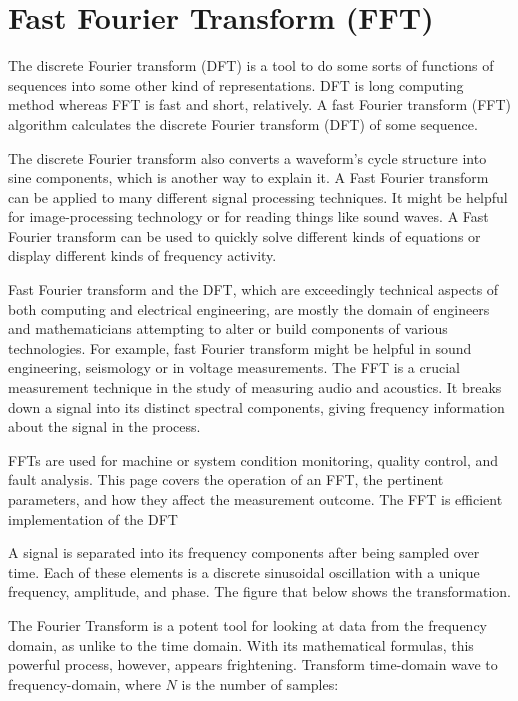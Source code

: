 \documentclass[a4paper, 12pt]{scrartcl}
\begin{document}
\section{Fast Fourier Transform (FFT)}

The discrete Fourier transform (DFT) is a tool to do some sorts of functions of sequences into some other kind of representations.
DFT is long computing method whereas FFT is fast and short, relatively.
A fast Fourier transform (FFT) algorithm calculates the discrete Fourier transform (DFT) of some sequence.

The discrete Fourier transform also converts a waveform's cycle structure into sine components, which is another way to explain it.
A Fast Fourier transform can be applied to many different signal processing techniques.
It might be helpful for image-processing technology or for reading things like sound waves.
A Fast Fourier transform can be used to quickly solve different kinds of equations or display different kinds of frequency activity.

Fast Fourier transform and the DFT, which are exceedingly technical aspects of both computing and electrical engineering, are mostly the domain of engineers and mathematicians attempting to alter or build components of various technologies.
For example, fast Fourier transform might be helpful in sound engineering, seismology or in voltage measurements.
The FFT is a crucial measurement technique in the study of measuring audio and acoustics.
It breaks down a signal into its distinct spectral components, giving frequency information about the signal in the process.

FFTs are used for machine or system condition monitoring, quality control, and fault analysis.
This page covers the operation of an FFT, the pertinent parameters, and how they affect the measurement outcome.
The FFT is efficient implementation of the DFT~\cite{FFT}

A signal is separated into its frequency components after being sampled over time.
Each of these elements is a discrete sinusoidal oscillation with a unique frequency, amplitude, and phase.
The figure that below shows the transformation.

The Fourier Transform is a potent tool for looking at data from the frequency domain, as unlike to the time domain.
With its mathematical formulas, this powerful process, however, appears frightening.
Transform time-domain wave to frequency-domain, where $N$ is the number of samples:
\end{document}
